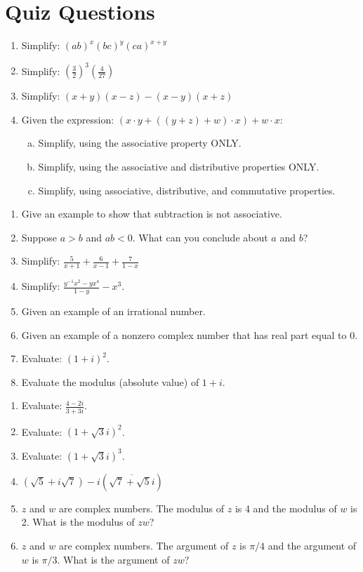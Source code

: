 \chapter{Quiz Questions}\label{QuizPractice}

\begin{enumerate}[(1)]
\item
Simplify:
$ (ab)^x(bc)^y(ca)^{x+y}$
\item
Simplify:
$ \displaystyle{\left(\frac{3}{2}\right)^3 \left(\frac{4}{27}\right)} $
\item
Simplify:   $ \displaystyle{(x+y)(x-z) - (x-y)(x+z) }$
\item
Given the expression:  $(x \cdot y + ((y+z)+w) \cdot x) + w \cdot x$:
\begin{enumerate}[(a)]
\item
Simplify, using the associative property ONLY.
\item
Simplify, using the associative and distributive properties ONLY.
\item
Simplify, using associative, distributive, and commutative properties.
\end{enumerate}
\end{enumerate}

\begin{enumerate}[(1)]
\item
Give an example to show that subtraction is not associative.
\item
Suppose $a>b$ and $ab < 0$.  What can you conclude about $a$ and $b$?
\item
Simplify:   $\displaystyle{ \frac{5}{x+1} + \frac{6}{x-1} + \frac{7}{1-x}}$
\item
Simplify: $\displaystyle{\frac{y^{-1}x^2 - y x^4}{1-y} - x^3}$.
\item
Given an example of an irrational number.
\item
Given an example of a nonzero complex number that has real part equal to 0.
\item
Evaluate: $(1+i)^2$.
\item
Evaluate the modulus (absolute value) of $1+i$.
\end{enumerate}

\begin{enumerate}[(1)]
\item
Evaluate:  $\displaystyle{\frac{4 - 2i}{3 + 3i}}$.
\item
Evaluate:  $(1 + \sqrt{3}i)^2$.
\item
Evaluate:  $(1 + \sqrt{3}i)^3$.
\item
$( \sqrt{5} + i \sqrt{7}) - i (\overline{\sqrt{7} + \sqrt{5}i})$
\item
$z$ and $w$ are complex numbers. The modulus of $z$ is 4 and the modulus of $w$ is 2. What is the modulus of $zw$?
\item
$z$ and $w$ are complex numbers. The argument of $z$ is $\pi/4$ and the argument of $w$ is $\pi/3$. What is the argument of $zw$?
\end{enumerate}

